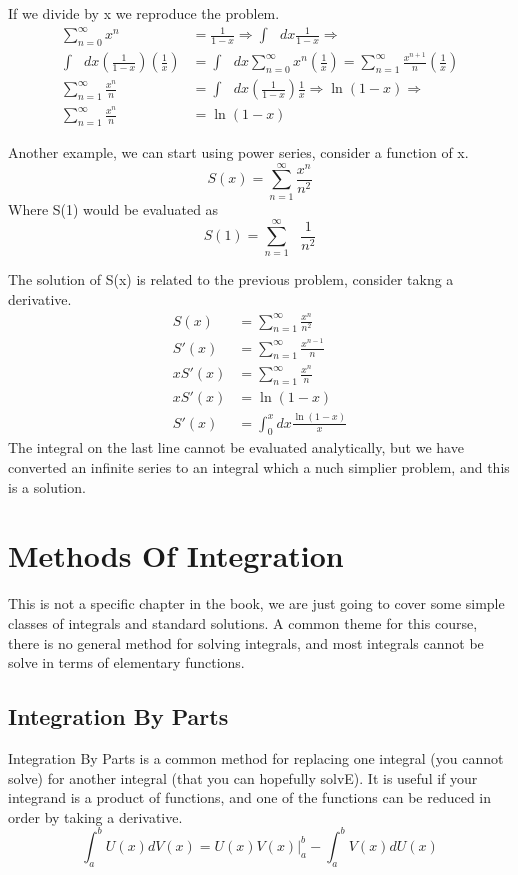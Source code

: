 \documentclass{article}
\newcommand{\be}{\begin{equation}}
\newcommand{\ee}{\end{equation}}
\newcommand{\sums}{\sum_{n=0}^\infty}
\begin{document}
If we divide by x we reproduce the problem.
\be
\begin{split}
	\sums x^n &= \frac{1}{1-x} \Rightarrow \int \text{ } dx \frac{1}{1-x} \Rightarrow\\
	\int \text{ } dx \left(\frac{1}{1-x}\right)\left(\frac{1}{x}\right) &= \int \text{ } dx \sums x^n\left(\frac{1}{x}\right) = \sum_{n=1}^\infty \frac{x^{n+1}}{n} \left(\frac{1}{x}\right) \\
	\sum_{n=1}^\infty \frac{x^n}{n} &= \int \text{ } dx \left(\frac{1}{1-x}\right) \frac{1}{x} \Rightarrow \ln(1-x) \Rightarrow\\
	\sum_{n=1}^\infty \frac{x^n}{n} &= \ln(1-x) 
\end{split}
\ee

Another example, we can start using power series, consider a function of x.
\be
S(x) = \sum_{n=1}^\infty \frac{x^n}{n^2}
\ee
Where S(1) would be evaluated as
\be
S(1) = \sum_{n=1}^\infty \text{ }\frac{1}{n^2}
\ee

The solution of S(x) is related to the previous problem, consider takng a derivative. 
\be
\begin{split}
	S(x) &= \sum_{n=1}^\infty \frac{x^n}{n^2}\\
	S'(x) &= \sum_{n=1}^\infty \frac{x^{n-1}}{n}\\
	x S'(x) &= \sum_{n=1}^\infty \frac{x^{n}}{n}\\
	x S'(x) &= \ln(1-x)\\
	S'(x) &= \int_0^x dx \frac{\ln(1-x)}{x}
\end{split}
\ee
The integral on the last line cannot be evaluated analytically, but we have converted an infinite series to an integral which a nuch simplier problem, and this is a solution.

\section*{Methods Of Integration}
This is not a specific chapter in the book, we are just going to cover some simple classes of integrals and standard solutions. 
A common theme for this course, there is no general method for solving integrals, and most integrals cannot be solve in terms of elementary functions. 

\subsection*{Integration By Parts}
Integration By Parts is a common method for replacing one integral (you cannot solve) for another integral (that you can hopefully solvE).
It is useful if your integrand is a product of functions, and one of the functions can be reduced in order by taking a derivative. 
\be
\int_a^b U(x) dV(x) = U(x) V(x) \bigg | _a^b - \int_a^b V(x) dU(x)
\ee
\end{document}
